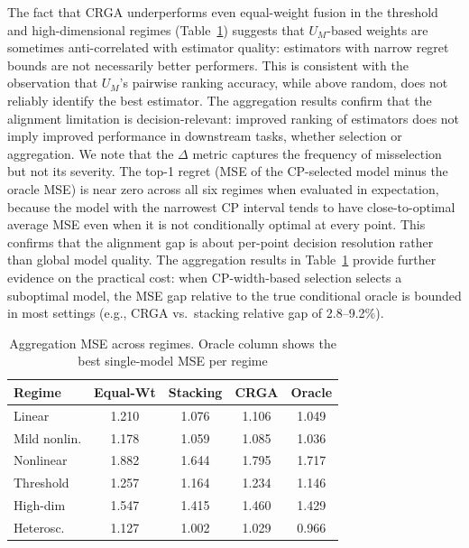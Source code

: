 \documentclass[pdflatex,sn-mathphys-ay]{sn-jnl}%
\theoremstyle{thmstyleone}%
\theoremstyle{thmstyletwo}%
\theoremstyle{thmstylethree}%
\begin{document}
The fact that CRGA underperforms even equal-weight fusion in the threshold and high-dimensional regimes (Table~\ref{tab:aggregation}) suggests that $U_M$-based weights are sometimes anti-correlated with estimator quality: estimators with narrow regret bounds are not necessarily better performers. This is consistent with the observation that $U_M$'s pairwise ranking accuracy, while above random, does not reliably identify the best estimator. The aggregation results confirm that the alignment limitation is decision-relevant: improved ranking of estimators does not imply improved performance in downstream tasks, whether selection or aggregation. We note that the $\Delta$ metric captures the frequency of misselection but not its severity. The top-1 regret (MSE of the CP-selected model minus the oracle MSE) is near zero across all six regimes when evaluated in expectation, because the model with the narrowest CP interval tends to have close-to-optimal average MSE even when it is not conditionally optimal at every point. This confirms that the alignment gap is about per-point decision resolution rather than global model quality. The aggregation results in Table~\ref{tab:aggregation} provide further evidence on the practical cost: when CP-width-based selection selects a suboptimal model, the MSE gap relative to the true conditional oracle is bounded in most settings (e.g., CRGA vs.\ stacking relative gap of 2.8--9.2\%).

\begin{table}[t]
    \centering
    \caption{Aggregation MSE across regimes. Oracle column shows the best single-model MSE per regime}
    \label{tab:aggregation}
    \begin{tabular}{lcccc}
        \toprule
        Regime & Equal-Wt & Stacking & CRGA & Oracle \\
        \midrule
        Linear       & 1.210 & 1.076 & 1.106 & 1.049 \\
        Mild nonlin.   & 1.178 & 1.059 & 1.085 & 1.036 \\
        Nonlinear    & 1.882 & 1.644 & 1.795 & 1.717 \\
        Threshold    & 1.257 & 1.164 & 1.234 & 1.146 \\
        High-dim     & 1.547 & 1.415 & 1.460 & 1.429 \\
        Heterosc.    & 1.127 & 1.002 & 1.029 & 0.966 \\
        \bottomrule
    \end{tabular}
\end{table}
\end{document}
